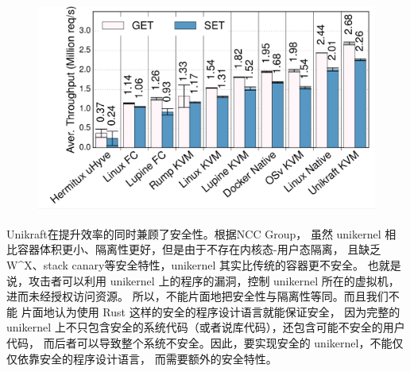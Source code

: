 \documentclass[UTF8,fontset=none,linespread=1.15]{ctexart}
\let\nosupcite\cite
\renewcommand*{\cite}[1]{\textsuperscript{\nosupcite{#1}}}
\begin{document}
\begin{figure}[H]
\begin{minipage}{0.32\linewidth}
\includegraphics[width=1\linewidth]{pictures/Unikraft-throughput.png}
\caption{}
\end{minipage}
\end{figure}

Unikraft在提升效率的同时兼顾了安全性。根据NCC Group\cite{bib:unikernel-secuirty}，
虽然 unikernel 相比容器体积更小、隔离性更好，但是由于不存在内核态-用户态隔离，
且缺乏W\^{}X、stack canary等安全特性，unikernel 其实比传统的容器更不安全。
也就是说，攻击者可以利用 unikernel 上的程序的漏洞，控制 unikernel 所在的虚拟机，
进而未经授权访问资源。
所以，不能片面地把安全性与隔离性等同。而且我们不能
片面地认为使用 Rust 这样的安全的程序设计语言就能保证安全，
因为完整的 unikernel 上不只包含安全的系统代码（或者说库代码），还包含可能不安全的用户代码，
而后者可以导致整个系统不安全。因此，要实现安全的 unikernel，不能仅仅依靠安全的程序设计语言，
而需要额外的安全特性。
\end{document}
